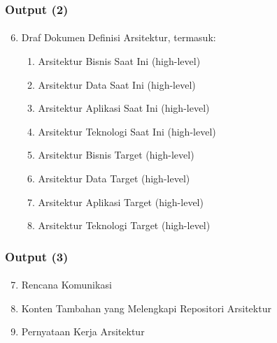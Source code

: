 \documentclass[aspectratio=169, table]{beamer}
\begin{document}
	\begin{frame}
		\frametitle{Output (2)}
		\framesubtitle{\hspace{1cm}}
		\begin{enumerate}
			\setcounter{enumi}{5}
			\item Draf Dokumen Definisi Arsitektur, termasuk:
			\begin{enumerate}
				\item Arsitektur Bisnis Saat Ini (high-level)
				\item Arsitektur Data Saat Ini (high-level)
				\item Arsitektur Aplikasi Saat Ini (high-level)
				\item Arsitektur Teknologi Saat Ini (high-level)
				\item Arsitektur Bisnis Target (high-level)
				\item Arsitektur Data Target (high-level)
				\item Arsitektur Aplikasi Target (high-level)
				\item Arsitektur Teknologi Target (high-level)
			\end{enumerate}
		
		\end{enumerate}
	\end{frame}
	
	
	\begin{frame}
		\frametitle{Output (3)}
		\framesubtitle{\hspace{1cm}}
		\begin{enumerate}
			\setcounter{enumi}{6}
			\item Rencana Komunikasi
			\item Konten Tambahan yang Melengkapi Repositori Arsitektur
			\item Pernyataan Kerja Arsitektur
		\end{enumerate}
	\end{frame}
	
	
	
\end{document}
